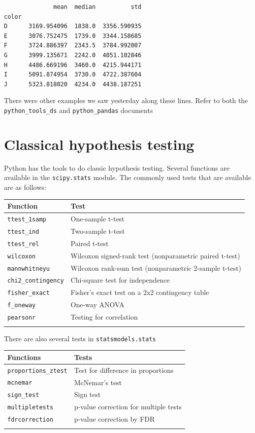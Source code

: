 \documentclass[
  letterpaper,
]{scrbook}
\begin{document}
\begin{verbatim}
              mean  median          std
color                                  
D      3169.954096  1838.0  3356.590935
E      3076.752475  1739.0  3344.158685
F      3724.886397  2343.5  3784.992007
G      3999.135671  2242.0  4051.102846
H      4486.669196  3460.0  4215.944171
I      5091.874954  3730.0  4722.387604
J      5323.818020  4234.0  4438.187251
\end{verbatim}

There were other examples we saw yesterday along these lines. Refer to both the \texttt{python\_tools\_ds} and \texttt{python\_pandas} documents

\hypertarget{classical-hypothesis-testing}{%
\section{Classical hypothesis testing}\label{classical-hypothesis-testing}}

Python has the tools to do classic hypothesis testing. Several functions are available in the \texttt{scipy.stats} module. The commonly used tests that are available are as follows:

\begin{longtable}[]{@{}ll@{}}
\toprule
Function & Test\tabularnewline
\midrule
\endhead
\texttt{ttest\_1samp} & One-sample t-test\tabularnewline
\texttt{ttest\_ind} & Two-sample t-test\tabularnewline
\texttt{ttest\_rel} & Paired t-test\tabularnewline
\texttt{wilcoxon} & Wilcoxon signed-rank test (nonparametric paired t-test)\tabularnewline
\texttt{mannwhitneyu} & Wilcoxon rank-sum test (nonparametric 2-sample t-test)\tabularnewline
\texttt{chi2\_contingency} & Chi-square test for independence\tabularnewline
\texttt{fisher\_exact} & Fisher's exact test on a 2x2 contingency table\tabularnewline
\texttt{f\_oneway} & One-way ANOVA\tabularnewline
\texttt{pearsonr} & Testing for correlation\tabularnewline
&\tabularnewline
\bottomrule
\end{longtable}

There are also several tests in \texttt{statsmodels.stats}

\begin{longtable}[]{@{}ll@{}}
\toprule
Functions & Tests\tabularnewline
\midrule
\endhead
\texttt{proportions\_ztest} & Test for difference in proportions\tabularnewline
\texttt{mcnemar} & McNemar's test\tabularnewline
\texttt{sign\_test} & Sign test\tabularnewline
\texttt{multipletests} & p-value correction for multiple tests\tabularnewline
\texttt{fdrcorrection} & p-value correction by FDR\tabularnewline
&\tabularnewline
\bottomrule
\end{longtable}
\end{document}

